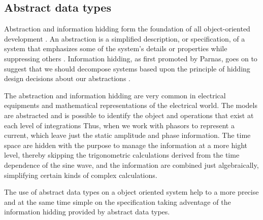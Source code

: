 \subsection{Abstract data types}

Abstraction and information hidding form 
the foundation of all object-oriented 
development \cite{Levy:1984}. 
An abstraction is a simplified description, 
or specification, of a system that emphasizes 
some of the system's details or properties while
suppressing others \cite{Shaw:1984}.
Information hidding, as first promoted by Parnas,
goes on to suggest that we should decompose 
systems based upon the principle of hidding 
design decisions about our 
abstractions \cite{Parnas:1979} \cite{Grady:1995}.

The abstraction and information hidding 
are very common in electrical equipments and 
mathematical representations of the 
electrical world. The 
models are abstracted 
and is possible to identify the object and 
operations that exist at each level of integrations 
Thus, 
when  we work 
with phasors to represent a current, which 
leave just the static amplitude and phase
information. The time space are hidden with 
the purpose to manage the information 
at a more hight level, 
thereby skipping the trigonometric calculations 
derived from the time dependence of the sine wave, 
and the information are combined just algebraically, 
simplifying certain kinds of complex 
calculations.  \cite{Grady:1995}


The use of abstract data types on a object oriented system 
help to a more precise and at the same time simple on the 
specification taking adventage of the information hidding 
provided by abstract 
data types. \cite{} 




